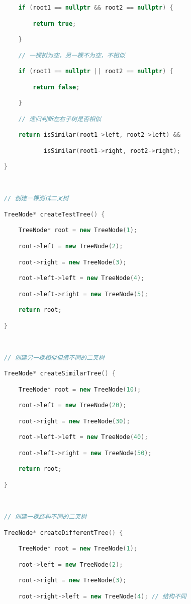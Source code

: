 \begin{lstlisting}[language=C++]
    if (root1 == nullptr && root2 == nullptr) {

        return true;

    }

    // 一棵树为空，另一棵不为空，不相似

    if (root1 == nullptr || root2 == nullptr) {

        return false;

    }

    // 递归判断左右子树是否相似

    return isSimilar(root1->left, root2->left) &&

           isSimilar(root1->right, root2->right);

}

  

// 创建一棵测试二叉树

TreeNode* createTestTree() {

    TreeNode* root = new TreeNode(1);

    root->left = new TreeNode(2);

    root->right = new TreeNode(3);

    root->left->left = new TreeNode(4);

    root->left->right = new TreeNode(5);

    return root;

}

  

// 创建另一棵相似但值不同的二叉树

TreeNode* createSimilarTree() {

    TreeNode* root = new TreeNode(10);

    root->left = new TreeNode(20);

    root->right = new TreeNode(30);

    root->left->left = new TreeNode(40);

    root->left->right = new TreeNode(50);

    return root;

}

  

// 创建一棵结构不同的二叉树

TreeNode* createDifferentTree() {

    TreeNode* root = new TreeNode(1);

    root->left = new TreeNode(2);

    root->right = new TreeNode(3);

    root->right->left = new TreeNode(4); // 结构不同


\end{lstlisting}
